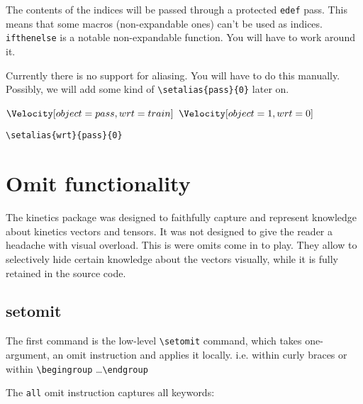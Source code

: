\documentclass[10pt,a4paper]{article}
\begin{document}
The contents of the indices will be passed through a protected \verb+edef+ pass. This means that some macros (non-expandable ones) can't be used as indices. \verb+ifthenelse+ is a notable non-expandable function. You will have to work around it.

\begin{SideBySideExample}[xrightmargin=2cm,frame=single]
  \AngularImpulse[wrt=\mywrt]
\end{SideBySideExample}

Currently there is no support for aliasing. You will have to do this manually. Possibly, we will add some kind of \verb+\setalias{pass}{0}+ later on.

\begin{SideBySideExample}[xrightmargin=1cm,frame=single]
  \def\pass{pass}
  \def\train{train}
  $\Velocity[object=\pass,wrt=\train]$
  \def\pass{1}
  \def\train{0}
  $\Velocity[object=\pass,wrt=\train]$
\end{SideBySideExample}

\verb+\setalias{wrt}{pass}{0}+



\section{Omit functionality}

The kinetics package was designed to faithfully capture and represent knowledge about kinetics vectors and tensors. It was not designed to give the reader a headache with visual overload. This is were omits come in to play. They allow to selectively hide certain knowledge about the vectors visually, while it is fully retained in the source code. 


\subsection{setomit}
The first command is the low-level \verb=\setomit= command, which takes one-argument, an omit instruction and applies it locally. i.e. within curly braces or within \verb=\begingroup= \ldots \verb=\endgroup= 

The \verb=all= omit instruction captures all keywords:
\begin{SideBySideExample}[xrightmargin=1cm,frame=single]
  \AngularImpulse[object=1,wrt=0]
\end{SideBySideExample}
\end{document}

